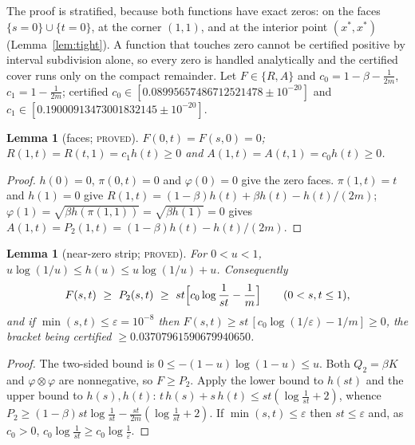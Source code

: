 \documentclass[11pt]{article}
\theoremstyle{plain}
\newtheorem{lemma}[theorem]{Lemma}
\theoremstyle{definition}
\theoremstyle{remark}
\newcommand{\lbl}[1]{\textsc{#1}}
\begin{document}
The proof is stratified, because both functions have exact zeros: on the
faces $\{s=0\}\cup\{t=0\}$, at the corner $(1,1)$, and at the interior point
$(x^\ast,x^\ast)$ (Lemma~\ref{lem:tight}).  A function that touches zero cannot
be certified positive by interval subdivision alone, so every zero is handled
analytically and the certified cover runs only on the compact remainder.
Let $F\in\{R,A\}$ and $c_0=1-\beta-\tfrac1{2m}$, $c_1=1-\tfrac1{2m}$; certified
$c_0\in[0.08995657486712521478\pm10^{-20}]$ and
$c_1\in[0.19000913473001832145\pm10^{-20}]$.

\begin{lemma}[faces; \lbl{proved}]\label{lem:faces}
$F(0,t)=F(s,0)=0$; $R(1,t)=R(t,1)=c_1h(t)\ge0$ and $A(1,t)=A(t,1)=c_0h(t)\ge0$.
\end{lemma}
\begin{proof}
$h(0)=0$, $\pi(0,t)=0$ and $\varphi(0)=0$ give the zero faces.  $\pi(1,t)=t$
and $h(1)=0$ give $R(1,t)=(1-\beta)h(t)+\beta h(t)-h(t)/(2m)$;
$\varphi(1)=\sqrt{\beta h(\pi(1,1))}=\sqrt{\beta h(1)}=0$ gives
$A(1,t)=P_2(1,t)=(1-\beta)h(t)-h(t)/(2m)$.
\end{proof}

\begin{lemma}[near-zero strip; \lbl{proved}]\label{lem:strip}
For $0<u<1$, $u\log(1/u)\le h(u)\le u\log(1/u)+u$.  Consequently
\[
  F(s,t)\ \ge\ P_2(s,t)\ \ge\ st\Bigl[c_0\log\frac1{st}-\frac1m\Bigr]
  \qquad(0<s,t\le1),
\]
and if $\min(s,t)\le\varepsilon=10^{-8}$ then
$F(s,t)\ge st\,[c_0\log(1/\varepsilon)-1/m]\ge0$, the bracket being certified
$\ge0.03707961590679940650$.
\end{lemma}
\begin{proof}
The two-sided bound is $0\le-(1-u)\log(1-u)\le u$.  Both $Q_2=\beta K$ and
$\varphi\otimes\varphi$ are nonnegative, so $F\ge P_2$.  Apply the lower bound
to $h(st)$ and the upper bound to $h(s),h(t)$:
$t\,h(s)+s\,h(t)\le st(\log\tfrac1{st}+2)$, whence
$P_2\ge(1-\beta)st\log\tfrac1{st}-\tfrac{st}{2m}(\log\tfrac1{st}+2)$.
If $\min(s,t)\le\varepsilon$ then $st\le\varepsilon$ and, as $c_0>0$,
$c_0\log\frac1{st}\ge c_0\log\frac1\varepsilon$.
\end{proof}
\end{document}
